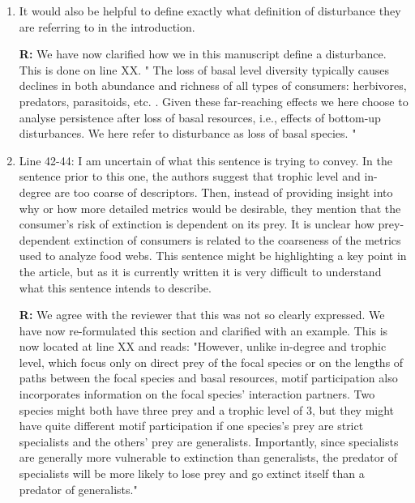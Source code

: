 \documentclass[12pt]{article}
\begin{document}
\begin{enumerate}
            \item It would also be helpful to define exactly what definition of disturbance they are referring to in the introduction.
            
             \textbf{R:}
             We have now clarified how we in this manuscript define a disturbance. This is done on line XX. " The loss of  basal level diversity typically causes declines in both abundance and richness of all types of consumers: herbivores, predators, parasitoids, etc. \citep{scherber2010bottom}. Given these far-reaching effects we here choose to analyse persistence after loss of basal resources, i.e., effects of bottom-up disturbances. We here refer to disturbance as loss of basal species. "


            \item Line 42-44: I am uncertain of what this sentence is trying to convey. In the sentence prior to this one, the authors suggest that trophic level and in-degree are too coarse of descriptors. Then, instead of providing insight into why or how more detailed metrics would be desirable, they mention that the consumer's risk of extinction is dependent on its prey. It is unclear how prey-dependent extinction of consumers is related to the coarseness of the metrics used to analyze food webs. This sentence might be highlighting a key point in the article, but as it is currently written it is very difficult to understand what this sentence intends to describe.

                \textbf{R:}
            We agree with the reviewer that this was not so clearly expressed. We have now re-formulated this section and clarified with an example. This is now located at line XX and reads: "However, unlike in-degree and trophic level, which focus only on direct prey of the focal species or on the lengths of paths between the focal species and basal resources, motif participation also incorporates information on the focal species' interaction partners. Two species might both have three prey and a trophic level of 3, but they might have quite different motif participation if one species's prey are strict specialists and the others' prey are generalists. Importantly, since specialists are generally more vulnerable to extinction than generalists, the predator of specialists will be more likely to lose prey and go extinct itself than a predator of generalists."



\end{enumerate}
\end{document}
